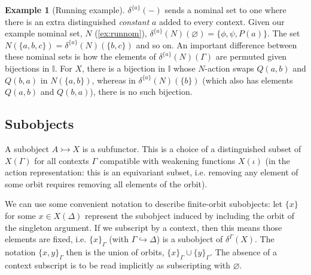 \documentclass{article}
\theoremstyle{definition}
\newtheorem{example}{Example}[section]
\newcommand{\II}{\mathbb{I}}
\begin{document}
\begin{example}[Running example]

$\delta^{\{a\}}(-)$ sends a nominal set to one where there is an extra distinguished {\it constant} $a$ added to every context. 
Given our example nominal set, $N$ (\cref{ex:runnom}), $\delta^{\{a\}}(N)(\varnothing) = \{\phi,\psi,P(a)\}$. 
The set $N(\{a,b,c\})=\delta^{\{a\}}(N)(\{b,c\})$ and so on. 
An important difference between these nominal sets is how the elements of $\delta^{\{a\}}(N)(\Gamma)$ are permuted given bijections in $\II$. 
For $X$, there is a bijection in $\II$ whose $N$-action swaps $Q(a,b)$ and $Q(b,a)$ in $N(\{a,b\})$, whereas in $\delta^{\{a\}}(N)(\{b\})$ (which also has elements $Q(a,b)$ and $Q(b,a)$), there is no such bijection.

\end{example}

\subsection*{Subobjects}


A subobject $A \rightarrowtail X$ is a subfunctor. 
This is a choice of a distinguished subset of $X(\Gamma)$ for all contexts $\Gamma$ compatible with weakening functions $X(\iota)$ (in the action representation: this is an equivariant subset, i.e. removing any element of some orbit requires removing all elements of the orbit). 

We can use some convenient notation to describe finite-orbit subobjects: let $\{x\}$ for some $x \in X(\Delta)$ represent the subobject induced by including the orbit of the singleton argument. If we subscript by a context, then this means those elements are fixed, i.e. $\{x\}_\Gamma$ (with $\Gamma\hookrightarrow \Delta$) is a subobject of $\delta^\Gamma(X)$. The notation $\{x,y\}_\Gamma$ then is the union of orbits, $\{x\}_\Gamma\cup\{y\}_\Gamma$. The absence of a context subscript is to be read implicitly as subscripting with $\varnothing$.  
\end{document}
